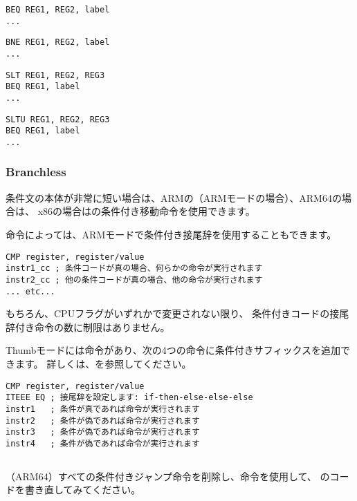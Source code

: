 \begin{lstlisting}[caption=Check for equal values,style=customasmMIPS]
BEQ REG1, REG2, label
...
\end{lstlisting}

\begin{lstlisting}[caption=Check for non-equal values,style=customasmMIPS]
BNE REG1, REG2, label
...
\end{lstlisting}

\begin{lstlisting}[caption=Check for less than (signed),style=customasmMIPS]
SLT REG1, REG2, REG3
BEQ REG1, label
...
\end{lstlisting}

\begin{lstlisting}[caption=Check for less than (unsigned),style=customasmMIPS]
SLTU REG1, REG2, REG3
BEQ REG1, label
...
\end{lstlisting}

\subsubsection{Branchless}

条件文の本体が非常に短い場合は、ARMの（ARMモードの場合）、ARM64の場合は、
x86の場合はの条件付き移動命令を使用できます。


命令によっては、ARMモードで条件付き接尾辞を使用することもできます。

\begin{lstlisting}[caption=ARM (\ARMMode),style=customasmARM]
CMP register, register/value
instr1_cc ; 条件コードが真の場合、何らかの命令が実行されます
instr2_cc ; 他の条件コードが真の場合、他の命令が実行されます
... etc...
\end{lstlisting}

もちろん、CPUフラグがいずれかで変更されない限り、
条件付きコードの接尾辞付き命令の数に制限はありません。


Thumbモードには命令があり、次の4つの命令に条件付きサフィックスを追加できます。
詳しくは、を参照してください。

\begin{lstlisting}[caption=ARM (\ThumbMode),style=customasmARM]
CMP register, register/value
ITEEE EQ ; 接尾辞を設定します: if-then-else-else-else
instr1   ; 条件が真であれば命令が実行されます
instr2   ; 条件が偽であれば命令が実行されます
instr3   ; 条件が偽であれば命令が実行されます
instr4   ; 条件が偽であれば命令が実行されます
\end{lstlisting}

\subsection{\Exercise}

（ARM64）すべての条件付きジャンプ命令を削除し、命令を使用して、
 のコードを書き直してみてください。
